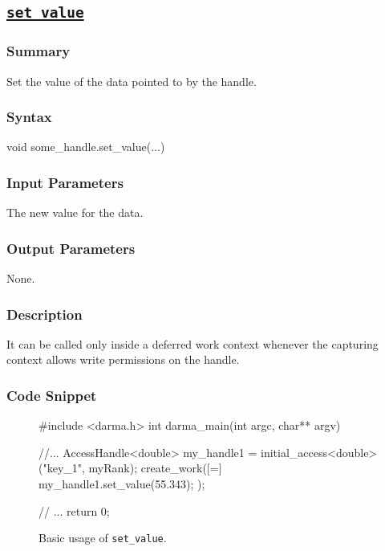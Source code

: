 \clearpage
\subsection{\underline{\texttt{set\_value}}}

\hspace{0.1cm} %
\begin{subs}
\vspace{-1.2cm}

\subsubsection{Summary} 
Set the value of the data pointed to by the handle.

\subsubsection{Syntax} 
\begin{CppCode}
void some_handle.set_value(...)
\end{CppCode}

\subsubsection{Input Parameters} 
The new value for the data.

\subsubsection{Output Parameters} 
None.

\subsubsection{Description} 
It can be called only inside a deferred work context whenever 
the capturing context allows write permissions on the handle.


\subsubsection{Code Snippet} 
\begin{figure}[!h]
\begin{CppCodeNumb}
#include <darma.h>
int darma_main(int argc, char** argv)
{
	//...
  AccessHandle<double> my_handle1 = initial_access<double>("key_1", myRank);
  create_work([=]{
  	my_handle1.set_value(55.343);
  });

  // ... 
  return 0;
}
\end{CppCodeNumb}
\label{fig:fe_api_initialaccess}
\caption{Basic usage of \texttt{set\_value}.}
\end{figure}

\end{subs}






